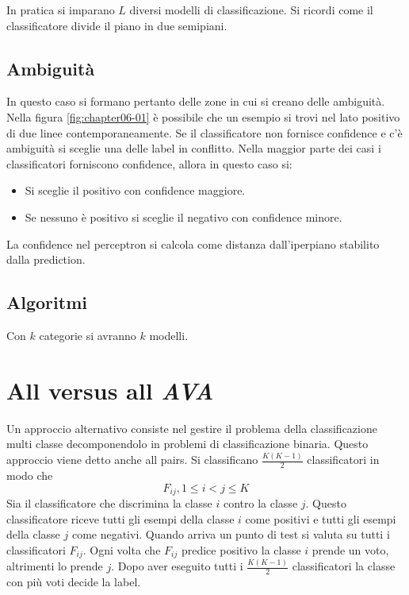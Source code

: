 In pratica si imparano $L$ diversi modelli di classificazione.
Si ricordi come il classificatore divide il piano in due semipiani.

	\subsection{Ambiguit\`a}
	In questo caso si formano pertanto delle zone in cui si creano delle ambiguit\`a. 
	Nella figura \ref{fig:chapter06-01} \`e possibile che un esempio si trovi nel lato positivo di due linee contemporaneamente.
	Se il classificatore non fornisce confidence e c'\`e ambiguit\`a si sceglie una delle label in conflitto.
	Nella maggior parte dei casi i classificatori forniscono confidence, allora in questo caso si:
	\begin{itemize}
		\item Si sceglie il positivo con confidence maggiore.
		\item Se nessuno \`e positivo si sceglie il negativo con confidence minore.
	\end{itemize}
	La confidence nel perceptron si calcola come distanza dall'iperpiano stabilito dalla prediction.
	
	\subsection{Algoritmi}
	
	
	Con $k$ categorie si avranno $k$ modelli.
	
	

\section{All versus all \emph{AVA}}
Un approccio alternativo consiste nel gestire il problema della classificazione multi classe decomponendolo in problemi di classificazione binaria.
Questo approccio viene detto anche all pairs.
Si classificano $\frac{K(K-1)}{2}$ classificatori in modo che
$$F_{ij}, 1\le i< j \le K$$
Sia il classificatore che discrimina la classe $i$ contro la classe $j$.
Questo classificatore riceve tutti gli esempi della classe $i$ come positivi e tutti gli esempi della classe $j$ come negativi.
Quando arriva un punto di test si valuta su tutti i classificatori $F_{ij}$.
Ogni volta che $F_{ij}$ predice positivo la classe $i$ prende un voto, altrimenti lo prende $j$.
Dopo aver eseguito tutti i $\frac{K(K-1)}{2}$ classificatori la classe con pi\`u voti decide la label.

